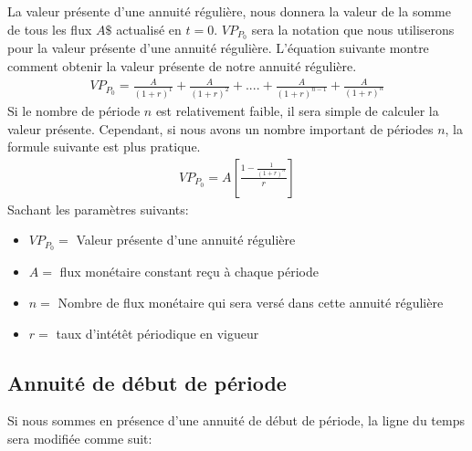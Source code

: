 \documentclass[letterpaper, 12pt]{article}
\newcommand{\1}{\mathds{1}}	%
\theoremstyle{definition}
\begin{document}
La valeur présente d'une annuité régulière, nous donnera la valeur de la somme de tous les flux $A\$$ actualisé en $t=0$. $VP_{P_0}$ sera la notation que nous utiliserons pour la valeur présente d'une annuité régulière. L'équation suivante montre comment obtenir la valeur présente de notre annuité régulière.  
\begin{align*}
VP_{P_0} = \frac{A}{(1+r)^{1}}+\frac{A}{(1+r)^{2}}+....+\frac{A}{(1+r)^{n-1}}+\frac{A}{(1+r)^{n}}
\end{align*}
Si le nombre de période $n$ est relativement faible, il sera simple de calculer la valeur présente. Cependant, si nous avons un nombre important de périodes $n$, la formule suivante est plus pratique. 
\begin{align*}
VP_{P_0}=A \left[ \frac{1-\frac{1}{(1+r)^n}}{r} \right]
\end{align*}
Sachant les paramètres suivants: 
\begin{itemize}
\item $VP_{P_0}=$ Valeur présente d'une annuité régulière 
\item $A=$ flux monétaire constant reçu à chaque période  
\item $n=$ Nombre de flux monétaire qui sera versé dans cette annuité régulière
\item $r=$ taux d'intétêt périodique en vigueur 
\end{itemize}

\subsection{Annuité de début de période}
Si nous sommes en présence d'une annuité de début de période, la ligne du temps sera modifiée comme suit: \\

  
\end{document}
